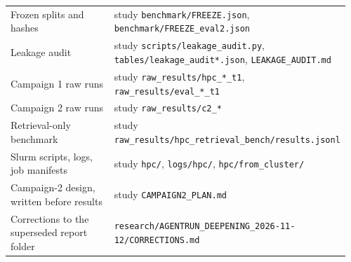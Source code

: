 \documentclass[10.5pt,a4paper,oneside]{report}
\begin{document}
\begin{longtable}{>{\raggedright\arraybackslash}p{0.646\linewidth}>{\raggedright\arraybackslash}p{0.314\linewidth}}
Frozen splits and hashes & study \texttt{benchmark/\allowbreak{}FREEZE.\allowbreak{}json}, \texttt{benchmark/\allowbreak{}FREEZE\_\allowbreak{}eval2.\allowbreak{}json} \\
Leakage audit & study \texttt{scripts/\allowbreak{}leakage\_\allowbreak{}audit.\allowbreak{}py}, \texttt{tables/\allowbreak{}leakage\_\allowbreak{}audit*.\allowbreak{}json}, \texttt{LEAKAGE\_\allowbreak{}AUDIT.\allowbreak{}md} \\
Campaign 1 raw runs & study \texttt{raw\_\allowbreak{}results/\allowbreak{}hpc\_\allowbreak{}*\_\allowbreak{}t1}, \texttt{raw\_\allowbreak{}results/\allowbreak{}eval\_\allowbreak{}*\_\allowbreak{}t1} \\
Campaign 2 raw runs & study \texttt{raw\_\allowbreak{}results/\allowbreak{}c2\_\allowbreak{}*} \\
Retrieval-only benchmark & study \texttt{raw\_\allowbreak{}results/\allowbreak{}hpc\_\allowbreak{}retrieval\_\allowbreak{}bench/\allowbreak{}results.\allowbreak{}jsonl} \\
Slurm scripts, logs, job manifests & study \texttt{hpc/\allowbreak{}}, \texttt{logs/\allowbreak{}hpc/\allowbreak{}}, \texttt{hpc/\allowbreak{}from\_\allowbreak{}cluster/\allowbreak{}} \\
Campaign-2 design, written before results & study \texttt{CAMPAIGN2\_\allowbreak{}PLAN.\allowbreak{}md} \\
Corrections to the superseded report folder & \texttt{research/\allowbreak{}AGENTRUN\_\allowbreak{}DEEPENING\_\allowbreak{}2026-11-12/\allowbreak{}CORRECTIONS.\allowbreak{}md} \\
\end{longtable}
\endgroup
\end{document}
